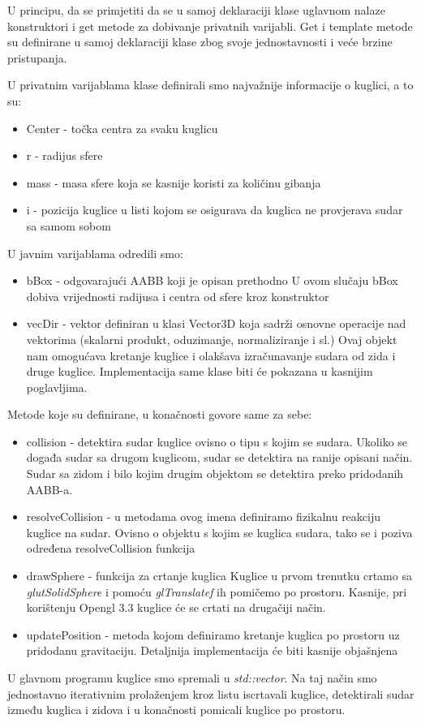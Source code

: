 U principu, da se primjetiti da se u samoj deklaraciji klase uglavnom nalaze konstruktori i get metode za dobivanje privatnih varijabli. Get i template metode su definirane u samoj deklaraciji klase zbog svoje jednostavnosti i veće brzine pristupanja.

U privatnim varijablama klase definirali smo najvažnije informacije o kuglici, a to su:

\begin{itemize}
	\item Center - točka centra za svaku kuglicu
	\item r - radijus sfere
	\item mass - masa sfere koja se kasnije koristi za količinu gibanja
	\item i - pozicija kuglice u listi kojom se osigurava da kuglica ne provjerava sudar sa samom sobom 

\end{itemize}

U javnim varijablama odredili smo:
\begin{itemize}
	\item bBox - odgovarajući AABB koji je opisan prethodno
	\newline
	U ovom slučaju bBox dobiva vrijednosti radijusa i centra od sfere kroz konstruktor
	\item vecDir - vektor definiran u klasi Vector3D koja sadrži osnovne operacije nad vektorima (skalarni produkt, oduzimanje, normaliziranje i sl.)
	\newline
	Ovaj objekt nam omogućava kretanje kuglice i olakšava izračunavanje sudara od zida i druge kuglice. Implementacija same klase biti će pokazana u kasnijim poglavljima.
	
\end{itemize}

Metode koje su definirane, u konačnosti govore same za sebe:
\begin{itemize}
	\item collision - detektira sudar kuglice ovisno o tipu s kojim se sudara.\newline
	Ukoliko se događa sudar sa drugom kuglicom, sudar se detektira na ranije opisani način. Sudar sa zidom i bilo kojim drugim objektom se detektira preko pridodanih AABB-a.
	\item resolveCollision - u metodama ovog imena definiramo fizikalnu reakciju kuglice na sudar. Ovisno o objektu s kojim se kuglica sudara, tako se i poziva određena resolveCollision funkcija
	\item drawSphere - funkcija za crtanje kuglica
	\newline
	Kuglice u prvom trenutku crtamo sa \emph{glutSolidSphere} i pomoću \emph{glTranslatef} ih pomičemo po prostoru. Kasnije, pri korištenju Opengl 3.3 kuglice će se crtati na drugačiji način.
	\item updatePosition - metoda kojom definiramo kretanje kuglica po prostoru uz pridodanu gravitaciju. \newline
	Detaljnija implementacija će biti kasnije objašnjena
\end{itemize}

U glavnom programu kuglice smo spremali u  \emph{std::vector}. Na taj način smo jednostavno iterativnim prolaženjem kroz listu iscrtavali kuglice, detektirali sudar između kuglica i zidova i u konačnosti pomicali kuglice po prostoru.
 